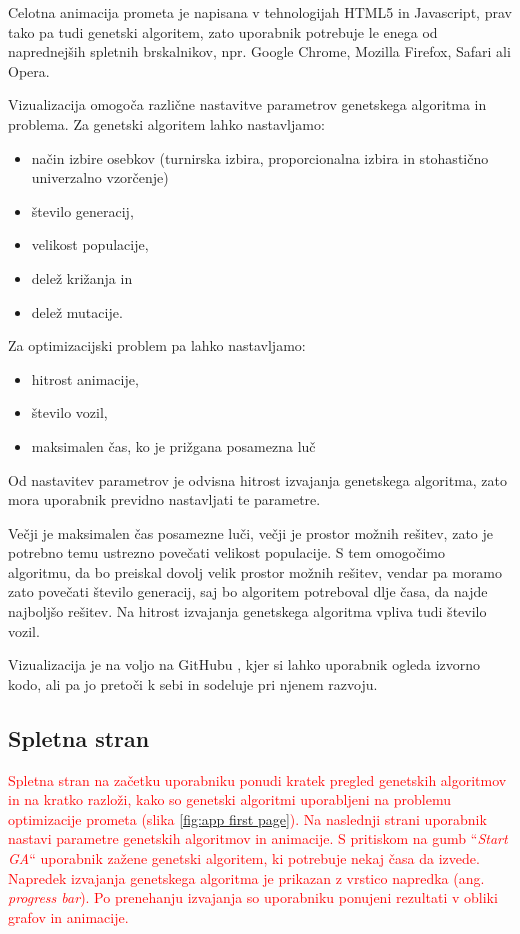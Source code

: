 \documentclass[a4paper, 12pt]{book}
\begin{document}
Celotna animacija prometa je napisana v tehnologijah HTML5 in Javascript, prav tako pa tudi genetski algoritem, zato uporabnik potrebuje le enega od naprednej\v sih spletnih brskalnikov, npr. Google Chrome, Mozilla Firefox, Safari ali Opera.

Vizualizacija omogo\v ca razli\v cne nastavitve parametrov genetskega algoritma in problema. Za genetski algoritem lahko nastavljamo:

\begin{itemize}
\item na\v cin izbire osebkov (turnirska izbira, proporcionalna izbira in stohasti\v cno univerzalno vzor\v cenje)
\item \v stevilo generacij,
\item velikost populacije,
\item dele\v z kri\v zanja in
\item dele\v z mutacije.
\end{itemize}

Za optimizacijski problem pa lahko nastavljamo:

\begin{itemize}
\item hitrost animacije,
\item \v stevilo vozil,
\item maksimalen \v cas, ko je pri\v zgana posamezna lu\v c
\end{itemize}

Od nastavitev parametrov je odvisna hitrost izvajanja genetskega algoritma, zato mora uporabnik previdno nastavljati te parametre.

Ve\v cji je maksimalen \v cas posamezne lu\v ci, ve\v cji je prostor mo\v znih re\v sitev, zato je potrebno temu ustrezno pove\v cati velikost populacije. S tem omogo\v cimo algoritmu, da bo preiskal dovolj velik prostor mo\v znih re\v sitev, vendar pa moramo zato pove\v cati \v stevilo generacij, saj bo algoritem potreboval dlje \v casa, da najde najbolj\v so re\v sitev. Na hitrost izvajanja genetskega algoritma vpliva tudi \v stevilo vozil.

Vizualizacija je na voljo na GitHubu \cite{izvorna koda}, kjer si lahko uporabnik ogleda izvorno kodo, ali pa jo preto\v ci k sebi in sodeluje pri njenem razvoju.

\subsection{Spletna stran}
\textcolor{red}{Spletna stran na za\v cetku uporabniku ponudi kratek pregled genetskih algoritmov in na kratko razlo\v zi, kako so genetski algoritmi uporabljeni na problemu optimizacije prometa (slika \ref{fig:app first page}). Na naslednji strani uporabnik nastavi parametre genetskih algoritmov in animacije. S pritiskom na gumb ``\textit{Start GA}`` uporabnik za\v zene genetski algoritem, ki potrebuje nekaj \v casa da izvede. Napredek izvajanja genetskega algoritma je prikazan z vrstico napredka (ang. \textit{progress bar}). Po prenehanju izvajanja so uporabniku ponujeni rezultati v obliki grafov in animacije.}
\end{document}
